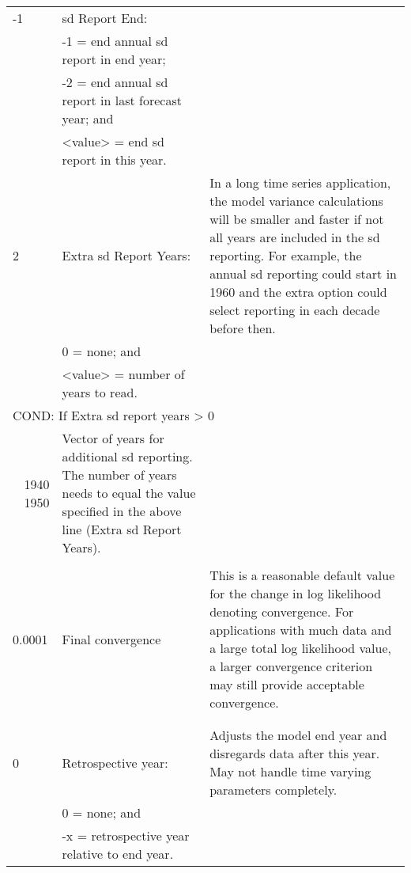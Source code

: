 {\begin{landscape}
\begin{longtable}{p{1.5cm} p{7.2cm} p{12.3cm}}
 \hline
 -1 & \gls{sd} Report End: & \Tstrut\\
    & -1 = end annual \gls{sd} report in end year; & \\
    & -2 = end annual \gls{sd} report in last forecast year; and & \\
    & <value> = end \gls{sd} report in this year. & \Bstrut\\
	   
 \hline
 2 & Extra \gls{sd} Report Years: & \multirow{1}{1cm}[-0.25cm]{\parbox{12.5cm}{In a long time series application, the model variance calculations will be smaller and faster if not all years are included in the \gls{sd} reporting. For example, the annual \gls{sd} reporting could start in 1960 and the extra option could select reporting in each decade before then.}} \Tstrut \Bstrut\\
   & 0 = none; and & \\
   & <value> = number of years to read. & \Bstrut\\

 \hline  
 \multicolumn{3}{l}{COND: If Extra \gls{sd} report years > 0} \Tstrut\\

 \hline
 \multicolumn{1}{r}{1940 1950} & \multirow{1}{1cm}[-0.25cm]{\parbox{19.5cm}{Vector of years for additional \gls{sd} reporting. The number of years needs to equal the value specified in the above line (Extra \gls{sd} Report Years).}} \\
  & & \\

 \pagebreak
 0.0001 & Final convergence & \multirow{1}{1cm}[-0.25cm]{\parbox{12.5cm}{This is a reasonable default value for the change in log likelihood denoting convergence. For applications with much data and a large total log likelihood value, a larger convergence criterion may still provide acceptable convergence.}} \Tstrut\Bstrut\\
   & & \Bstrut\\
   & & \Bstrut\\
 
 \hline
 0 & Retrospective year: & \multirow{1}{1cm}[-0.25cm]{\parbox{12.5cm}{Adjusts the model end year and disregards data after this year. May not handle time varying parameters completely.}} \Tstrut\\
   & 0 = none; and & \\
   & -x = retrospective year relative to end year. & \Bstrut\\
  

\end{longtable}
\end{landscape}}

